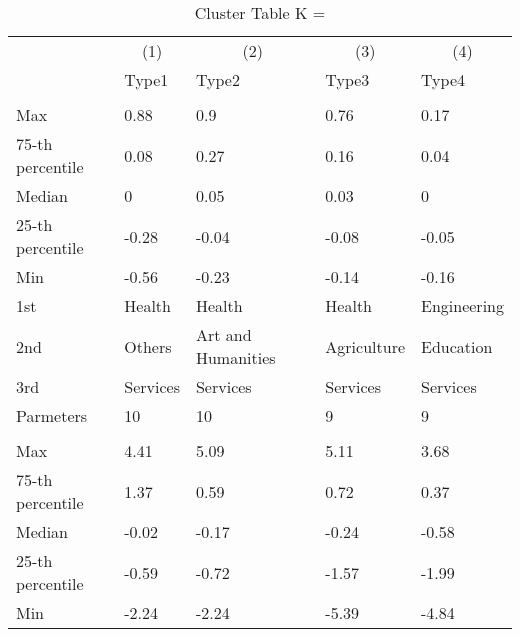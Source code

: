 \begin{table}
\centering
\caption{Cluster Table K = }
\centering
\begin{threeparttable}
\begin{tabular}[t]{lllll}
\toprule
\multicolumn{1}{c}{ } & \multicolumn{1}{c}{(1)} & \multicolumn{1}{c}{(2)} & \multicolumn{1}{c}{(3)} & \multicolumn{1}{c}{(4)} \\
\cmidrule(l{3pt}r{3pt}){2-2} \cmidrule(l{3pt}r{3pt}){3-3} \cmidrule(l{3pt}r{3pt}){4-4} \cmidrule(l{3pt}r{3pt}){5-5}
 & Type1 & Type2 & Type3 & Type4\\
\midrule
\addlinespace[0.3em]
\multicolumn{5}{l}{\textit{\textbf{Panel A: }}}\\
\hspace{1em}Max & 0.88 & 0.9 & 0.76 & 0.17\\
\hspace{1em}75-th percentile & 0.08 & 0.27 & 0.16 & 0.04\\
\hspace{1em}Median & 0 & 0.05 & 0.03 & 0\\
\hspace{1em}25-th percentile & -0.28 & -0.04 & -0.08 & -0.05\\
\hspace{1em}Min & -0.56 & -0.23 & -0.14 & -0.16\\
\hspace{1em}1st & Health & Health & Health & Engineering\\
\hspace{1em}2nd & Others & Art and Humanities & Agriculture & Education\\
\hspace{1em}3rd & Services & Services & Services & Services\\
\hspace{1em}Parmeters & 10 & 10 & 9 & 9\\
\addlinespace[0.3em]
\multicolumn{5}{l}{\textit{\textbf{Panel B: }}}\\
\hspace{1em}Max & 4.41 & 5.09 & 5.11 & 3.68\\
\hspace{1em}75-th percentile & 1.37 & 0.59 & 0.72 & 0.37\\
\hspace{1em}Median & -0.02 & -0.17 & -0.24 & -0.58\\
\hspace{1em}25-th percentile & -0.59 & -0.72 & -1.57 & -1.99\\
\hspace{1em}Min & -2.24 & -2.24 & -5.39 & -4.84\\

\end{tabular}
\end{threeparttable}
\end{table}
